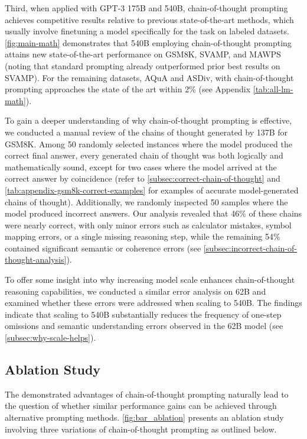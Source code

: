 Third, when applied with GPT-3 175B and \palm{} 540B, chain-of-thought prompting achieves competitive results relative to previous state-of-the-art methods, which usually involve finetuning a model specifically for the task on labeled datasets. \cref{fig:main-math} demonstrates that \palm{} 540B employing chain-of-thought prompting attains new state-of-the-art performance on GSM8K, SVAMP, and MAWPS (noting that standard prompting already outperformed prior best results on SVAMP). For the remaining datasets, AQuA and ASDiv, \palm{} with chain-of-thought prompting approaches the state of the art within 2\% (see Appendix \cref{tab:all-lm-math}).

To gain a deeper understanding of why chain-of-thought prompting is effective, we conducted a manual review of the chains of thought generated by \lamda{} 137B for GSM8K. Among 50 randomly selected instances where the model produced the correct final answer, every generated chain of thought was both logically and mathematically sound, except for two cases where the model arrived at the correct answer by coincidence (refer to \cref{subsec:correct-chain-of-thought} and \cref{tab:appendix-gsm8k-correct-examples} for examples of accurate model-generated chains of thought). Additionally, we randomly inspected 50 samples where the model produced incorrect answers. Our analysis revealed that 46\% of these chains were nearly correct, with only minor errors such as calculator mistakes, symbol mapping errors, or a single missing reasoning step, while the remaining 54\% contained significant semantic or coherence errors (see \cref{subsec:incorrect-chain-of-thought-analysis}).

To offer some insight into why increasing model scale enhances chain-of-thought reasoning capabilities, we conducted a similar error analysis on \palm{} 62B and examined whether these errors were addressed when scaling to \palm{} 540B. The findings indicate that scaling \palm{} to 540B substantially reduces the frequency of one-step omissions and semantic understanding errors observed in the 62B model (see \cref{subsec:why-scale-helps}).

\subsection{Ablation Study}\label{subsec:math-ablation}

The demonstrated advantages of chain-of-thought prompting naturally lead to the question of whether similar performance gains can be achieved through alternative prompting methods. 
\cref{fig:bar_ablation} presents an ablation study involving three variations of chain-of-thought prompting as outlined below.

